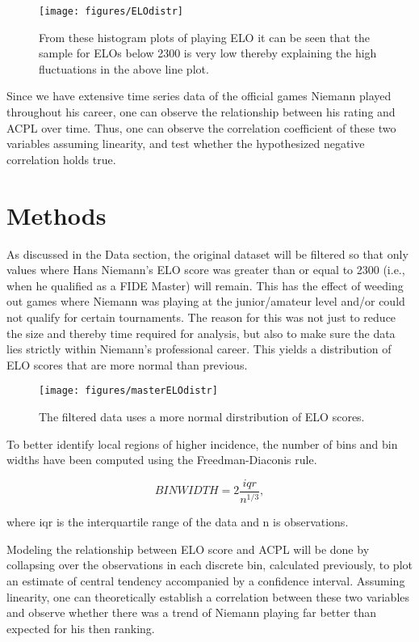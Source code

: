 \documentclass[12pt, letterpaper, titlepage]{article}
\begin{document}
\begin{figure}
    \centering
    \texttt{[image: figures/ELOdistr]}
    \caption{From these histogram plots of playing ELO it can be seen that the sample for ELOs below 2300 is very low thereby explaining the high fluctuations in the above line plot.}
    \label{fig:elo_histplot}
\end{figure}

Since we have extensive time series data of the official games Niemann played throughout his career, one can observe the relationship between his rating and ACPL over time. Thus, one can observe the correlation coefficient of these two variables assuming linearity, and test whether the hypothesized negative correlation holds true.

\section*{Methods}
\label{sec:meth}

As discussed in the Data section, the original dataset will be filtered so that only values where Hans Niemann's ELO score was greater than or equal to 2300 (i.e., when he qualified as a FIDE Master) will remain. This has the effect of weeding out games where Niemann was playing at the junior/amateur level and/or could not qualify for certain tournaments. The reason for this was not just to reduce the size and thereby time required for analysis, but also to make sure the data lies strictly within Niemann's professional career. This yields a distribution of ELO scores that are more normal than previous.

\begin{figure}
    \centering
    \texttt{[image: figures/masterELOdistr]}
    \caption{The filtered data uses a more normal dirstribution of ELO scores.}
    \label{fig:elogt23_histplot}
\end{figure}

To better identify local regions of higher incidence, the number of bins and bin widths have been computed using the Freedman-Diaconis rule.

\begin{equation}
    \label{eq:freedman-diaconis}
    BIN WIDTH = 2 \frac{iqr}{n^{1/3}},
\end{equation}

where iqr is the interquartile range of the data and n is observations.

Modeling the relationship between ELO score and ACPL will be done by collapsing over the observations in each discrete bin, calculated previously, to plot an estimate of central tendency accompanied by a confidence interval. Assuming linearity, one can theoretically establish a correlation between these two variables and observe whether there was a trend of Niemann playing far better than expected for his then ranking.
\end{document}
